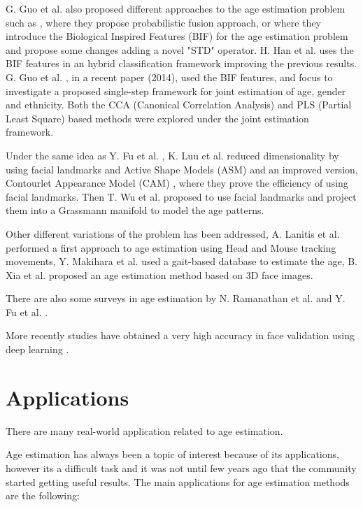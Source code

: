 G. Guo et al. also proposed different approaches to the age estimation problem such as
\cite{4563041}, where they propose probabilistic fusion approach, or \cite{conf/cvpr/GuoMFH09} where they introduce the Biological Inspired Features (BIF) for the age estimation problem and propose some changes adding a novel "STD" operator. H. Han et al. \cite{han:age} uses the BIF features in an hybrid classification framework improving the previous results. G. Guo et al. \cite{Guo2014761}, in a recent paper (2014), used the BIF features, and focus to investigate a proposed single-step framework for joint estimation of age, gender and ethnicity. Both the CCA (Canonical Correlation Analysis) and PLS (Partial Least Square) based methods were explored under the joint estimation framework.

Under the same idea as Y. Fu et al. \cite{4284917}, K. Luu et al. \cite{Luu:2009:AEU:1736406.1736456, LuuSSBS11} reduced dimensionality by using facial landmarks and Active Shape Models (ASM) \cite{Luu:2009:AEU:1736406.1736456} and an improved version, Contourlet Appearance Model (CAM) \cite{LuuSSBS11}, where they prove the efficiency of using facial landmarks. Then T. Wu et al. \cite{journals/tifs/WuTC12} proposed to use facial landmarks and project them into a Grassmann manifold to model the age patterns.

Other different variations of the problem has been addressed, A. Lanitis et al. \cite{5463396} performed a first approach to age estimation using Head and Mouse tracking movements, Y. Makihara et al. \cite{6117531} used a gait-based database to estimate the age, B. Xia et al. \cite{xia:hal-00904007} proposed an age estimation method based on 3D face images.

There are also some surveys in age estimation by N. Ramanathan et al. \cite{Ramanathan2009131} and Y. Fu et al. \cite{5406526}.

More recently studies have obtained a very high accuracy in face validation using deep learning \cite{facebook}.


\section{Applications}
There are many real-world application related to age estimation. 

Age estimation has always been a topic of interest because of its applications, however its a difficult task and it was not until few years ago that the community started getting useful results. The main applications for age estimation methods are the following:


